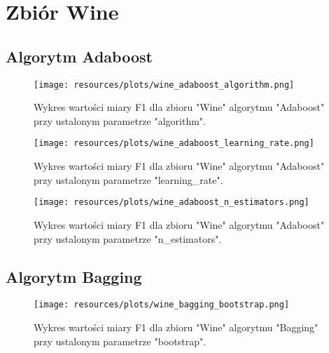 \section{Zbiór Wine}
\subsection{Algorytm Adaboost}


\begin{figure}[H]
    \center
    \texttt{[image: resources/plots/wine\_adaboost\_algorithm.png]}
    \caption{Wykres wartości miary F1 dla zbioru "Wine" algorytmu "Adaboost" przy ustalonym parametrze "algorithm".}   
\end{figure}                    

\pagebreak


\begin{figure}[H]
    \center
    \texttt{[image: resources/plots/wine\_adaboost\_learning\_rate.png]}
    \caption{Wykres wartości miary F1 dla zbioru "Wine" algorytmu "Adaboost" przy ustalonym parametrze "learning\_rate".}
\end{figure}

\pagebreak
                    

\begin{figure}[H]
    \center
    \texttt{[image: resources/plots/wine\_adaboost\_n\_estimators.png]}
    \caption{Wykres wartości miary F1 dla zbioru "Wine" algorytmu "Adaboost" przy ustalonym parametrze "n\_estimators".}
\end{figure}

\pagebreak
                    
\subsection{Algorytm Bagging}


\begin{figure}[H]
    \center
    \texttt{[image: resources/plots/wine\_bagging\_bootstrap.png]}
    \caption{Wykres wartości miary F1 dla zbioru "Wine" algorytmu "Bagging" przy ustalonym parametrze "bootstrap".}   
\end{figure}

\pagebreak
                    
